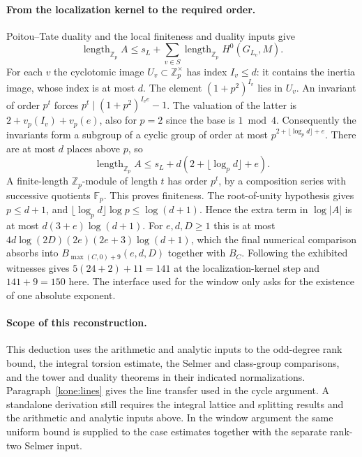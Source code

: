 \paragraph{From the localization kernel to the required order.}
Poitou--Tate duality and the local finiteness and duality inputs give
\[
 \operatorname{length}_{\mathbb Z_p} A
 \le s_L+\sum_{v\in S}\operatorname{length}_{\mathbb Z_p}H^0(G_{L_v},M).
\]
For each $v$ the cyclotomic image $U_v\subset\mathbb Z_p^\times$ has
index $I_v\le d$: it contains the inertia image, whose index is at most
$d$. The element $(1+p^2)^{I_v}$ lies in $U_v$.
An invariant of order $p^t$ forces
$p^t\mid (1+p^2)^{I_v e}-1$. The valuation of the latter is
$2+v_p(I_v)+v_p(e)$, also for $p=2$ since the base is $1\bmod 4$.
Consequently the invariants form a subgroup of a cyclic group of order
at most $p^{2+\lfloor\log_p d\rfloor+e}$. There are at most $d$ places
above $p$, so
\[
 \operatorname{length}_{\mathbb Z_p} A
 \le s_L+d(2+\lfloor\log_p d\rfloor+e).
\]
A finite-length $\mathbb Z_p$-module of length $t$ has order $p^t$,
by a composition series with successive quotients $\mathbb F_p$.
This proves finiteness. The root-of-unity hypothesis gives $p\le d+1$,
and $\lfloor\log_p d\rfloor\log p\le\log(d+1)$. Hence the extra term
in $\log|A|$ is at most $d(3+e)\log(d+1)$. For $e,d,D\ge1$ this is
at most $4d\log(2D)(2e)(2e+3)\log(d+1)$, which the final numerical
comparison absorbs into $B_{\max(C,0)+9}(e,d,D)$ together with $B_C$.
Following the exhibited witnesses gives $5(24+2)+11=141$ at the
localization-kernel step and $141+9=150$ here. The interface used for
the window only asks for the existence of one absolute exponent.

\paragraph{Scope of this reconstruction.}
This deduction uses the arithmetic and analytic inputs to the odd-degree
rank bound, the integral torsion estimate, the Selmer and class-group
comparisons, and the tower and duality theorems in their indicated
normalizations. Paragraph~\ref{kone:lines} gives the line transfer used in the cycle
argument. A standalone derivation still requires the integral lattice
and splitting results and the arithmetic and analytic inputs above. In the window argument
the same uniform bound is supplied to the case estimates together with the
separate rank-two Selmer input.

